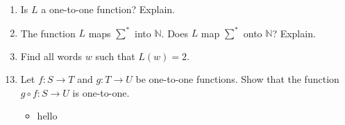\documentclass{article}
\newcommand{\N}{\mathbb{N}}
\begin{document}
\begin{enumerate}
\begin{enumerate}
	\item Is $L$ a one-to-one function? Explain.\\

	\item The function $L$ maps $\sum^\ast$ into $\N$. Does $L$ map $\sum^\ast$ onto $\N$? Explain.\\

	\item Find all words $w$ such that $L(w)=2$.\\
	
	\end{enumerate}
\end{enumerate}
\begin{enumerate}
\setcounter{enumi}{12}
\item Let $f : S\to T$ and $g: T\to U$ be one-to-one functions. Show that the function $g\circ f: S\to U$ is one-to-one.
	\begin{itemize}
	\item hello
	\end{itemize}
\end{enumerate}
\end{document}
